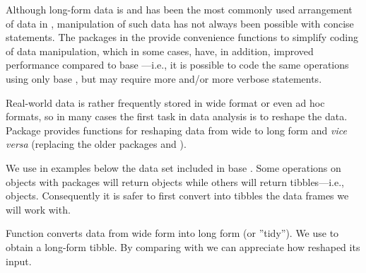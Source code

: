 \documentclass[krantz2]{krantz}\usepackage{knitr}
\begin{document}
Although long-form data is and has been the most commonly used arrangement of data in \Rlang, manipulation of such data has not always been possible with concise \Rlang statements. The packages in the  provide convenience functions to simplify coding of data manipulation, which in some cases, have, in addition, improved performance compared to base \Rlang---i.e., it is possible to code the same operations using only base \Rlang, but may require more and/or more verbose statements.

Real-world data is rather frequently stored in wide format or even ad hoc formats, so in many cases the first task in data analysis is to reshape the data. Package  provides functions for reshaping data from wide to long form and \emph{vice versa} (replacing the older packages  and ).

We use in examples below the  data set included in base \Rlang. Some operations on \Rlang {} objects with  packages will return  objects while others will return tibbles---i.e.,  objects. Consequently it is safer to first convert into tibbles the data frames we will work with.

\begin{knitrout}\footnotesize
{}\color{fgcolor}\begin{kframe}
\begin{alltt}
 \hlkwb{<-} 
\end{alltt}
\end{kframe}
\end{knitrout}

Function  converts data from wide form into long form (or ''tidy''). We use  to obtain a long-form tibble. By comparing  with  we can appreciate how  reshaped its input.
\end{document}
